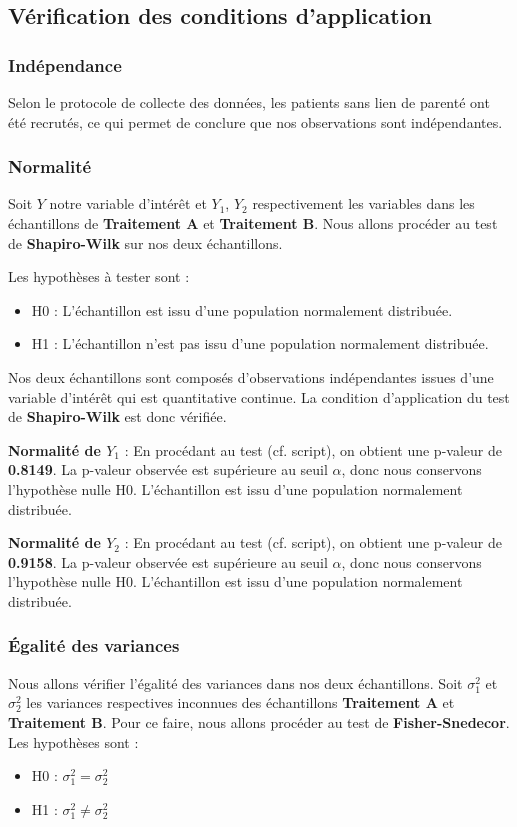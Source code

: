 \documentclass[12pt,a4paper]{article}
\begin{document}
	\subsection{Vérification des conditions d'application}
	
	\subsubsection{Indépendance}
	Selon le protocole de collecte des données, les patients sans lien de parenté ont été recrutés, ce qui permet de conclure que nos observations sont indépendantes.
	
	\subsubsection{Normalité}
	Soit $Y$ notre variable d'intérêt et $Y_1$, $Y_2$ respectivement les variables dans les échantillons de \textbf{Traitement A} et \textbf{Traitement B}. Nous allons procéder au test de \textbf{Shapiro-Wilk} sur nos deux échantillons.
	
	Les hypothèses à tester sont :
	\begin{itemize}
		\item H0 : L'échantillon est issu d'une population normalement distribuée.
		\item H1 : L'échantillon n'est pas issu d'une population normalement distribuée.
	\end{itemize}
	
	Nos deux échantillons sont composés d'observations indépendantes issues d'une variable d'intérêt qui est quantitative continue. La condition d'application du test de \textbf{Shapiro-Wilk} est donc vérifiée.
	
	\textbf{Normalité de $Y_1$} : En procédant au test (cf. script), on obtient une p-valeur de \textbf{0.8149}. La p-valeur observée est supérieure au seuil $\alpha$, donc nous conservons l'hypothèse nulle H0. L'échantillon est issu d'une population normalement distribuée.
	
	\textbf{Normalité de $Y_2$} : En procédant au test (cf. script), on obtient une p-valeur de \textbf{0.9158}. La p-valeur observée est supérieure au seuil $\alpha$, donc nous conservons l'hypothèse nulle H0. L'échantillon est issu d'une population normalement distribuée.
	
	\subsubsection{Égalité des variances}
	Nous allons vérifier l'égalité des variances dans nos deux échantillons. Soit $\sigma_{1}^2$ et $\sigma_{2}^2$ les variances respectives inconnues des échantillons \textbf{Traitement A} et \textbf{Traitement B}. Pour ce faire, nous allons procéder au test de \textbf{Fisher-Snedecor}. Les hypothèses sont :
	\begin{itemize}
		\item H0 : $\sigma_{1}^2 = \sigma_{2}^2$
		\item H1 : $\sigma_{1}^2 \neq \sigma_{2}^2$
	\end{itemize}
	
\end{document}
